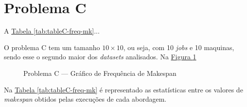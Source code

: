 \section{Problema C}
A \hyperref[tab:tableC-freq-mk]{Tabela \ref{tab:tableC-freq-mk}}...

O problema C tem um tamanho $10 \times 10$, ou seja, com 10 \textit{jobs} e 10 maquinas, 
sendo esse o segundo maior dos \textit{datasets} analisados.
Na \hyperref[fig:plobC-freq-mk]{Figura \ref{fig:plobC-freq-mk}} 
\begin{figure}[!htb]
    \caption{Problema C — Gráfico de Frequência de Makespan}
    \label{fig:plobC-freq-mk}
    \begin{minipage}{.5\linewidth}
        \centering
        \subfloat[]{
            \label{plobC-freq-mk:a}
            \resizebox{\linewidth}{!}{}
        }
    \end{minipage}%
    \begin{minipage}{.5\linewidth}
        \centering
        \subfloat[]{
            \label{plobC-freq-mk:b}
            \resizebox{\linewidth}{!}{}
        }
    \end{minipage}\par\medskip
      \centering
      \subfloat[]{
        \label{plobC-freq-mk:c}
        \resizebox{.5\linewidth}{!}{}
      }
\end{figure}
Na
\hyperref[tab:tableC-freq-mk]{Tabela \ref{tab:tableC-freq-mk}}
é representado as estatísticas entre os valores de \textit{makespan} obtidos pelas execuções de cada abordagem.
